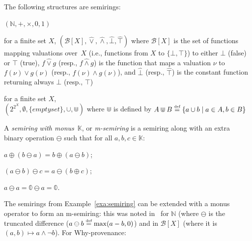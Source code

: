 \begin{example}
	\label{exa:semiring}
	The following structures are semirings:
	\begin{compactdesc}
		\item[Counting semiring] $(\mathbb{N}, +, \times, 0, 1)$
		\item[Boolean function semiring] for a finite set
		$X$, $(\mathcal{B}[X],\hat\lor,\hat\land,\hat\bot,\hat\top)$ where
		$\mathcal{B}[X]$ is the set of functions mapping valuations over~$X$
		(i.e., functions from $X$ to $\{\bot,\top\}$) to
		either $\bot$ (false) or $\top$ (true), $f\hat\lor g$ (resp.,
		$f\hat\land g$) is the function that maps
		a valuation $\nu$ to $f(\nu) \lor g(\nu)$ (resp., $f(\nu)\land
			g(\nu)$),
		and $\hat\bot$ (resp., $\hat\top$) is the constant function returning
		always $\bot$ (resp., $\top$)
		\item[Why-provenance \cite{bunemankt01}] for a finite set $X$,\\
		$(2^{2^X},\emptyset,\{emptyset\},\cup,\Cup)$ where $\Cup$ is defined
		by $A\Cup B\overset{\text{\tiny def}}{=} \{a\cup b\mid a\in A, b\in B\}$
	\end{compactdesc}
\end{example}

\begin{definition}
	A \emph{semiring with monus}~$\mathbb{K}$, or \emph{m-semiring} is a semiring
	along with an extra binary operation $\ominus$ such that for all $a,
		b, c\in\mathbb{K}$:
	\begin{inparaenum}[(i)]
		\item $a \oplus (b \ominus a) = b \oplus (a \ominus b)$;
		\item $(a \ominus b) \ominus c = a \ominus (b \oplus c)$;
		\item $a \ominus a = \mathbb{0} \ominus a = \mathbb{0}$.
	\end{inparaenum}
\end{definition}

The semirings from Example~\ref{exa:semiring} can be extended with a
monus operator to form an m-semiring: this was noted
in~\cite{dblp:journals/japll/geertsp10} for $\mathbb{N}$ (where $\ominus$
is the truncated
difference ($a\ominus b\overset{\text{\tiny def}}{=}\max(a-b, 0)$) and in $\mathcal{B}[X]$
(where it is $(a,b)\mapsto a \land\lnot b$). For Why-provenance:

